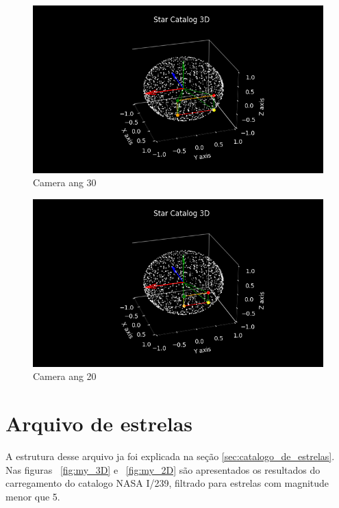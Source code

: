 \begin{figure}[H]
    \centering
    \includegraphics[width=1\columnwidth]{images/Camera_ang_30.png}
    \caption{Camera ang 30}
    \label{fig:Camera_ang_30. Fonte: Autoria própria}
\end{figure}

\begin{figure}[H]
    \centering
    \includegraphics[width=1\columnwidth]{images/Camera_ang_20.png}
    \caption{Camera ang 20}
    \label{fig:Camera_ang_20. Fonte: Autoria própria}
\end{figure}

\section{Arquivo de estrelas}

A estrutura desse arquivo ja foi explicada na seção \ref{sec:catalogo_de_estrelas}. 
Nas figuras ~\ref{fig:my_3D} e ~\ref{fig:my_2D} são apresentados os resultados do carregamento do catalogo NASA I/239, 
filtrado para estrelas com magnitude menor que 5.

